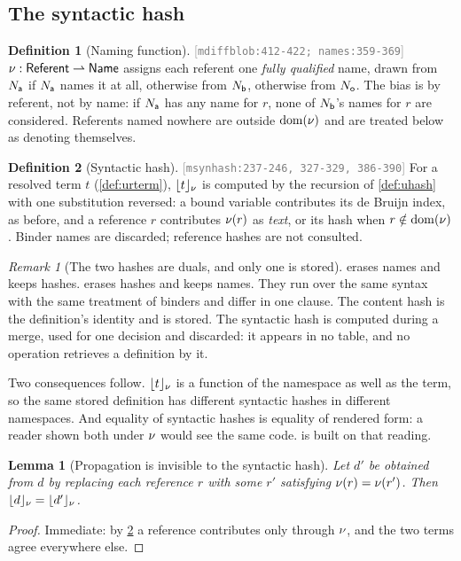 \documentclass[11pt]{article}
\theoremstyle{definition}
\newtheorem{definition}{Definition}[section]
\theoremstyle{plain}
\newtheorem{lemma}{Lemma}[section]
\theoremstyle{remark}
\newtheorem{remark}{Remark}[section]
\newcommand{\src}[1]{{\footnotesize\textcolor{gray}{[\texttt{#1}]}}}
\begin{document}
\subsection{The syntactic hash}

\begin{definition}[Naming function]\label{def:namer}
\src{mdiffblob:412-422; names:359-369} $\nu : \mathsf{Referent} \rightharpoonup \mathsf{Name}$ assigns each
referent one \emph{fully qualified} name, drawn from $N_{\mathsf{a}}$ if $N_{\mathsf{a}}$ names it at all, otherwise from
$N_{\mathsf{b}}$, otherwise from $N_{\mathsf{o}}$. The bias is by referent, not by name: if $N_{\mathsf{a}}$ has any name for $r$, none
of $N_{\mathsf{b}}$'s names for $r$ are considered. Referents named nowhere are outside $\operatorname{dom}(\nu)$ and are
treated below as denoting themselves.
\end{definition}

\begin{definition}[Syntactic hash]\label{def:synhash}
\src{msynhash:237-246, 327-329, 386-390} For a resolved term $t$ (\cref{def:urterm}),
$\lfloor t \rfloor_{\nu}$ is computed by the recursion of \cref{def:uhash} with one substitution reversed: a
bound variable contributes its de Bruijn index, as before, and a reference $r$ contributes
$\nu(r)$ as \emph{text}, or its hash when $r \notin \operatorname{dom}(\nu)$. Binder names are discarded;
reference hashes are not consulted.
\end{definition}

\begin{remark}[The two hashes are duals, and only one is stored]\label{rem:syn-dual}
 erases names and keeps hashes.  erases hashes and keeps names.
They run over the same syntax with the same treatment of binders and differ in one clause. The
content hash is the definition's identity and is stored. The syntactic hash is computed during a
merge, used for one decision and discarded: it appears in no table, and no operation retrieves a
definition by it.

Two consequences follow. $\lfloor t \rfloor_{\nu}$ is a function of the namespace as well as the term, so the
same stored definition has different syntactic hashes in different namespaces. And equality of
syntactic hashes is equality of rendered form: a reader shown both under $\nu$ would see the same
code.  is built on that reading.
\end{remark}

\begin{lemma}[Propagation is invisible to the syntactic hash]\label{lem:prop-silent}
Let $d'$ be obtained from $d$ by replacing each reference $r$ with some $r'$ satisfying
$\nu(r) = \nu(r')$. Then $\lfloor d \rfloor_{\nu} = \lfloor d' \rfloor_{\nu}$.
\end{lemma}
\begin{proof}
Immediate: by \cref{def:synhash} a reference contributes only through $\nu$, and the two terms
agree everywhere else.
\end{proof}
\end{document}
